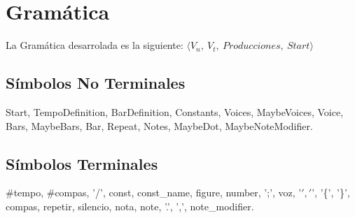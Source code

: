 \section{Gramática}

La Gramática desarrolada es la siguiente: $\langle V_n,\ V_t,\ Producciones,\ Start \rangle$

\subsection{Símbolos No Terminales}

Start, TempoDefinition, BarDefinition, Constants, Voices, MaybeVoices, Voice, Bars, MaybeBars, Bar, Repeat, Notes, MaybeDot, MaybeNoteModifier.

\subsection{Símbolos Terminales}

\#tempo, \#compas, '/', const, const\_name, figure, number, ';', voz, '\(', '\)', '\{', '\}', compas, repetir, silencio, nota, note, '.', ',', note\_modifier.

